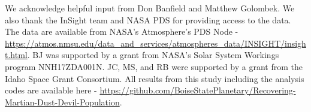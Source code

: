 \documentclass[linenumbers,trackchanges]{aastex63}
\begin{document}
\acknowledgments

We acknowledge helpful input from Don Banfield and Matthew Golombek. We also thank the InSight team and NASA PDS for providing access to the data. The data are available from NASA's Atmosphere's PDS Node - \url{https://atmos.nmsu.edu/data_and_services/atmospheres_data/INSIGHT/insight.html}. BJ was supported by a grant from NASA's Solar System Workings program NNH17ZDA001N. JC, MS, and RB were supported by a grant from the Idaho Space Grant Consortium. All results from this study including the analysis codes are available here - \url{https://github.com/BoiseStatePlanetary/Recovering-Martian-Dust-Devil-Population}.

%

\vspace{5mm}




\end{document}
